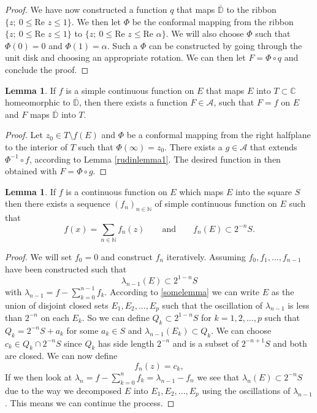 \documentclass[a4paper,12pt,twoside,BCOR=10mm]{scrbook}
\theoremstyle{definition}
\theoremstyle{definition}
\newtheorem{lemma}[theorem]{Lemma}
\theoremstyle{definition}
\renewcommand{\Re}{\text{Re }}
\begin{document}
\begin{proof}
We have now constructed a function $q$ that maps $\overline{\mathbb{D}}$ to the ribbon $\{z;\ 0 \leq \Re z \leq 1\}$.
We then let $\Phi$ be the conformal mapping from the ribbon $\{z;\ 0 \leq \Re z \leq 1\}$ to $\{z;\ 0 \leq \Re z \leq \Re \alpha\}$.
We will also choose $\Phi$ such that $\Phi(0) = 0$ and $\Phi(1) = \alpha$.
Such a $\Phi$ can be constructed by going through the unit disk and choosing an appropriate rotation.
We can then let $F = \Phi \circ q$ and conclude the proof.

\end{proof}
\begin{lemma}
\label{rudinlemma2}
If $f$ is a simple continuous function on $E$ that maps $E$ into $T \subset \mathbb{C}$ homeomorphic to $\overline{\mathbb{D}}$, then there exists a function $F \in \mathcal{A}$, such that $F = f$ on $E$ and $F$ maps $\overline{\mathbb{D}}$ into $T$.
\end{lemma}
\begin{proof}
Let $z_0 \in T \setminus f(E)$ and $\Phi$ be a conformal mapping from the right halfplane to the interior of $T$ such that $\Phi(\infty) = z_0$.
There exists a $g \in \mathcal{A}$ that extends $\Phi^{-1} \circ f$, according to Lemma \ref{rudinlemma1}.
The desired function in then obtained with $F = \Phi \circ g$.
\end{proof}
\begin{lemma}
\label{rudinlemma3}
If $f$ is a continuous function on $E$ which maps $E$ into the square $S$ then there exists a sequence $(f_n)_{n \in \mathbb{N}}$ of simple continuous function on $E$ such that
\[
	f(x) = \sum_{n \in \mathbb{N}} f_n(z)
	\qquad \text{and} \qquad
	f_n(E) \subset 2^{-n}S.
\]
\end{lemma}
\begin{proof}
We will set $f_0 = 0$ and construct $f_n$ iteratively.
Assuming $f_0, f_1, ..., f_{n - 1}$ have been constructed such that
\[
	\lambda_{n - 1}(E) \subset 2^{1 - n}S
\]
with $\lambda_{n - 1} = f - \sum_{k = 0}^{n - 1}f_k$.
According to \ref{somelemma} we can write $E$ as the union of disjoint closed sets $E_1, E_2, ..., E_p$ such that the oscillation of $\lambda_{n - 1}$ is less than $2^{-n}$ on each $E_k$.
So we can define $Q_k \subset 2^{1 - n}S$ for $k = 1, 2, ..., p$ such that $Q_k = 2^{-n}S + a_k$ for some $a_k \in S$ and $\lambda_{n - 1}(E_k) \subset Q_k$.
We can choose $c_k \in Q_k \cap 2^{-n}S$ since $Q_k$ has side length $2^{-n}$ and is a subset of $2^{-n + 1}S$ and both are closed.
We can now define
\[
	f_n(z) = c_k, \tag*{$z \in E_k,\ k = 1, 2, ..., p$.}
\]
If we then look at $\lambda_n = f - \sum_{k = 0}^nf_k = \lambda_{n - 1} - f_n$ we see that $\lambda_n(E) \subset 2^{-n}S$ due to the way we decomposed $E$ into $E_1, E_2, ..., E_p$ using the oscillations of $\lambda_{n - 1}$.
This means we can continue the process.
\end{proof}
\end{document}
